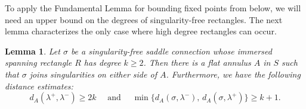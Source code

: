 \documentclass[11pt,letterpaper]{amsart}
\newcommand{\wt}{\widetilde}
\numberwithin{equation}{section}
\newtheorem{lemma}[theorem]{Lemma}
\theoremstyle{definition}
\begin{document}



To apply the Fundamental Lemma for bounding fixed points from below, we will need an upper bound on the degrees of singularity-free rectangles. The next lemma characterizes the only case where high degree rectangles can occur.

\begin{lemma}\label{Lem:LowDegreeAwayFromPocket}
Let $\sigma$ be a singularity-free saddle connection whose immersed spanning rectangle $R$ has degree $k \geq 2$. Then there is a flat annulus $A$ in $S$ such that $\sigma$ joins singularities on either side of $A$. Furthermore, we have the following distance estimates:
\[
d_A(\lambda^+,\lambda^-) \geq 2k \quad \text{ and } \quad
\min \{ d_A(\sigma, \lambda^-), \, d_A(\sigma, \lambda^+)\} \geq k+1.
\]
\end{lemma}
\end{document}
